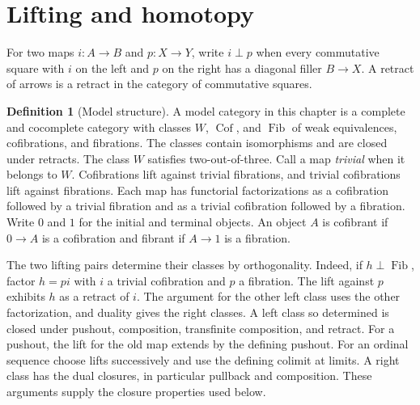 \documentclass[11pt,oneside,openany]{book}
\theoremstyle{definition}
\newtheorem{definition}[theorem]{Definition}
\theoremstyle{remark}
\begin{document}
\section{Lifting and homotopy}

For two maps \(i:A\to B\) and \(p:X\to Y\), write \(i\perp p\)
when every commutative square with \(i\) on the left and \(p\) on
the right has a diagonal filler \(B\to X\). A retract of arrows is
a retract in the category of commutative squares.

\begin{definition}[Model structure]\label{res:Q01}
A model category in this chapter is a complete and cocomplete category
with classes \(W\), \(\operatorname{Cof}\), and \(\operatorname{Fib}\)
of weak equivalences, cofibrations, and fibrations. The classes contain
isomorphisms and are closed under retracts. The class \(W\) satisfies
two-out-of-three. Call a map \emph{trivial} when it belongs to \(W\).
Cofibrations lift against trivial fibrations, and trivial cofibrations
lift against fibrations. Each map has functorial factorizations as a
cofibration followed by a trivial fibration and as a trivial cofibration
followed by a fibration.
Write \(0\) and \(1\) for the initial and terminal objects. An object
\(A\) is cofibrant if \(0\to A\) is a cofibration and fibrant if
\(A\to1\) is a fibration.
\end{definition}

The two lifting pairs determine their classes by orthogonality. Indeed,
if \(h\perp\operatorname{Fib}\), factor \(h=p i\) with \(i\) a
trivial cofibration and \(p\) a fibration. The lift against \(p\)
exhibits \(h\) as a retract of \(i\). The argument for the other
left class uses the other factorization, and duality gives the
right classes. A left class so determined is closed under pushout,
composition, transfinite composition, and retract. For a pushout,
the lift for the old map extends by the defining pushout. For an
ordinal sequence choose lifts successively and use the defining
colimit at limits. A right class has the dual closures, in
particular pullback and composition. These arguments supply the
closure properties used below.
\end{document}
